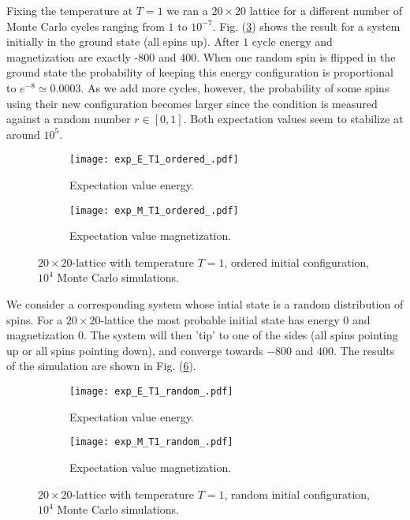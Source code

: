 \documentclass[11pt]{article}
\begin{document}
\begin{flushleft}
Fixing the temperature at $T=1$ we ran a $20 \times 20$ lattice for a different number of Monte Carlo cycles ranging from $1$ to $10^{-7}$. Fig. (\ref{fig:cms-EM T=1}) shows the result for a system initially in the ground state (all spins up). After $1$ cycle energy and magnetization are exactly -800 and 400. When one random spin is flipped in the ground state the probability of keeping this energy configuration is proportional to $e^{-8} \simeq 0.0003$. As we add more cycles, however, the probability of some spins using their new configuration becomes larger since the condition is measured against a random number $r \in [0,1]$. Both expectation values seem to stabilize at around $10^5$.


\begin{figure}[H]
\centering
\begin{subfigure}{.5\textwidth}
  \centering
  \texttt{[image: exp\_E\_T1\_ordered\_.pdf]}
  \caption{Expectation value energy.}
  \label{fig:sub1}
\end{subfigure}%
\begin{subfigure}{.5\textwidth}
  \centering
  \texttt{[image: exp\_M\_T1\_ordered\_.pdf]}
  \caption{Expectation value magnetization.}
  \label{fig:sub2}
\end{subfigure}
\caption{$20 \times 20$-lattice with temperature $T=1$, ordered initial configuration, $10^4$ Monte Carlo simulations.}
\label{fig:cms-EM T=1}
\end{figure}

\end{flushleft}

\begin{flushleft}
We consider a corresponding system whose intial state is a random distribution of spins. For a $20 \times 20$-lattice the most probable initial state has energy $0$ and magnetization $0$. The system will then 'tip' to one of the sides (all spins pointing up or all spins pointing down), and converge towards $-800$ and $400$. The results of the simulation are shown in Fig. (\ref{fig:cms-EM T=1 random}). 
\begin{figure}[H]
\centering
\begin{subfigure}{.5\textwidth}
  \centering
  \texttt{[image: exp\_E\_T1\_random\_.pdf]}
  \caption{Expectation value energy.}
  \label{fig:sub1}
\end{subfigure}%
\begin{subfigure}{.5\textwidth}
  \centering
  \texttt{[image: exp\_M\_T1\_random\_.pdf]}
  \caption{Expectation value magnetization.}
  \label{fig:sub2}
\end{subfigure}
\caption{$20 \times 20$-lattice with temperature $T=1$, random initial configuration, $10^4$ Monte Carlo simulations.}
\label{fig:cms-EM T=1 random}
\end{figure}
\end{flushleft}
\end{document}
